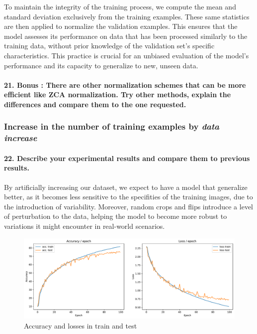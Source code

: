 \documentclass{article}
\theoremstyle{plain}%
\theoremstyle{definition}
\theoremstyle{remark}
\begin{document}
To maintain the integrity of the training process, we compute the mean and standard deviation exclusively from the training examples. These same statistics are then applied to normalize the validation examples. This ensures that the model assesses its performance on data that has been processed similarly to the training data, without prior knowledge of the validation set's specific characteristics. This practice is crucial for an unbiased evaluation of the model's performance and its capacity to generalize to new, unseen data.

\paragraph{21. Bonus : There are other normalization schemes that can be more efficient like ZCA normalization. Try other methods, explain the differences and compare them to the one requested.}

\subsubsection{Increase in the number of training examples by \textit{data increase}}
\paragraph{22. Describe your experimental results and compare them to previous results.}

By artificially increasing our dataset, we expect to have a model that generalize better, as it becomes less sensitive to the specifities of the training images, due to the introduction of variability. Moreover, random crops and flips introduce a level of perturbation to the data, helping the model to become more robust to variations it might encounter in real-world scenarios.

\begin{figure}[H]
    \centering
    \includegraphics*[width=\textwidth]{figs/CNN/dataincrease.pdf}
    \caption{Accuracy and losses in train and test}
    \label{fig:dataincrease}
\end{figure}
\end{document}
